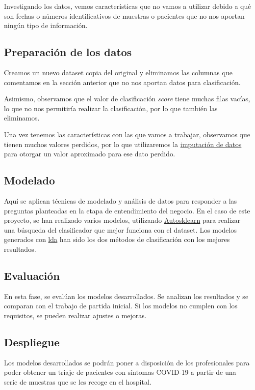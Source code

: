 Investigando los datos, vemos características que no vamos a utilizar debido a qué son fechas o números identificativos de muestras o pacientes que no nos aportan ningún tipo de información.

\subsection{Preparación de los datos}
Creamos un nuevo dataset copia del original y eliminamos las columnas que comentamos en la sección anterior que no nos aportan datos para clasificación.

Asimismo, observamos que el valor de clasificación \textit{score} tiene muchas filas vacías, lo que no nos permitiría realizar la clasificación, por lo que también las eliminamos.

Una vez tenemos las características con las que vamos a trabajar, observamos que tienen muchos valores perdidos, por lo que utilizaremos la \hyperref[imputadatos]{imputación de datos} para otorgar un valor aproximado para ese dato perdido.

\subsection{Modelado}
Aquí se aplican técnicas de modelado y análisis de datos para responder a las preguntas planteadas en la etapa de entendimiento del negocio. En el caso de este proyecto, se han realizado varios modelos, utilizando \hyperref[autosklearn]{Autosklearn} para realizar una búsqueda del clasificador que mejor funciona con el dataset. Los modelos generados con \hyperref[lda]{lda} han sido los dos métodos de clasificación con los mejores resultados.

\subsection{Evaluación}
En esta fase, se evalúan los modelos desarrollados. Se analizan los resultados y se comparan con el trabajo de partida inicial. Si los modelos no cumplen con los requisitos, se pueden realizar ajustes o mejoras.

\subsection{Despliegue}
Los modelos desarrollados se podrán poner a disposición de los profesionales para poder obtener un triaje de pacientes con síntomas COVID-19 a partir de una serie de muestras que se les recoge en el hospital.


